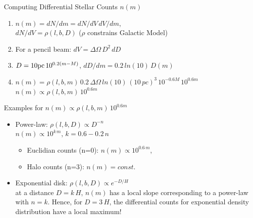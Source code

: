 \documentclass[letterpaper,landscape]{slides}
\begin{document}

\begin{slide}
\begin{center}
{\large \color{red}  Computing Differential Stellar Counts $n(m)$  }
\end{center}

\begin{enumerate}

\item
     $n(m) = dN/dm = dN/dV \, dV/dm$, \\ $dN/dV = \rho(l,b,D)$ ($\rho$ constrains Galactic Model)

\item
For a pencil beam: $dV = \Delta \Omega \, D^2 \, dD$

\item
      $D = 10 {\rm pc} \, 10^{0.2(m-M)}$, $dD/dm = 0.2\,ln(10)\, D(m)$

\item
 $n(m) = \rho(l,b,m)\, 0.2\, \Delta \Omega\,ln(10)\,(10\,pc)^3\,10^{-0.6M}\,10^{0.6m}$ \\

{\color{blue} \Large \hskip 1.5in   $n(m) \propto \rho(l,b,m)\, 10^{0.6m}$}

\end{enumerate}  

\vfill
\end{slide}




\begin{slide}
\begin{center}
{\large \color{red}  Examples for $n(m)\propto \rho(l,b,m)\, 10^{0.6m}$ }
\end{center}

\begin{itemize}
\item
{\color{red} Power-law: $ \rho(l,b,D) \propto D^{-n}$} \\

    {\color{blue} \hskip 1.5in    $  n(m) \propto 10^{k\, m}$, $k= 0.6-0.2\,n$}
        \begin{itemize}
         \item
            Euclidian counts (n=0):  $n(m) \propto 10^{0.6\, m}$,
          \item
            Halo counts (n=3):  $n(m) = const.$
       \end{itemize}  
\item 
{\color{red} Exponential disk:  $\rho(l,b,D) \propto e^{-D/H}$} \\
at a distance $D=k\,H$, $n(m)$ has a local slope corresponding to a power-law 
with $n=k$. Hence, for $D=3\,H$, the differential counts for exponential density
distribution have a local maximum! 
\end{itemize}  

\vfill
\end{slide}
\end{document}
